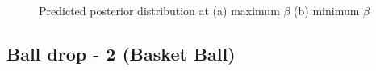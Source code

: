 \documentclass{article}
\begin{document}
\begin{figure}[H]
\begin{centering}
\,\,\,
\par\end{centering}

\caption{Predicted posterior distribution at (a) maximum $\beta$ (b) minimum
$\beta$}


\label{balldrop1t5-3}
\end{figure}



\subsection{Ball drop - 2 (Basket Ball)}
\end{document}
